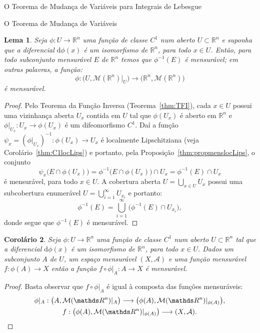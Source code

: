 \documentclass[oneside,final,11pt]{amsbook}
\newcommand{\R}{\mathds R}
\newcommand{\dd}{\mathrm d}
\newcommand{\Lebmens}{\mathcal M}
\theoremstyle{remark}\newtheorem{exercise}{Exercício}[chapter]
\theoremstyle{remark}\newtheorem{*exercise}[exercise]{\hbox to 0pt{\hskip 0pt minus 1fil*}Exercício}
\theoremstyle{definition}\newtheorem{exdefin}{Definição}[chapter]
\theoremstyle{plain}\newtheorem{teo}{Teorema}[section]
\theoremstyle{plain}\newtheorem{lem}[teo]{Lema}
\theoremstyle{plain}\newtheorem{prop}[teo]{Proposição}
\theoremstyle{plain}\newtheorem{cor}[teo]{Corolário}
\theoremstyle{definition}\newtheorem{defin}[teo]{Definição}
\theoremstyle{remark}\newtheorem{rem}[teo]{Observação}
\theoremstyle{definition}\newtheorem{notation}[teo]{Notação}
\theoremstyle{definition}\newtheorem{convention}[teo]{Convenção}
\theoremstyle{definition}\newtheorem{example}[teo]{Exemplo}
\numberwithin{section}{chapter}
\numberwithin{equation}{section}
\begin{document}
\begin{chapter}{O Teorema de Mudança de Variáveis para Integrais de Lebesgue}
\begin{section}{O Teorema de Mudança de Variáveis}
\begin{lem}\label{thm:difeoC1mensmens}
Seja $\phi:U\to\R^n$ uma função de classe $C^1$ num aberto $U\subset\R^n$ e suponha que a diferencial
$\dd\phi(x)$ é um isomorfismo de $\R^n$, para todo $x\in U$. Então, para todo subconjunto mensurável $E$
de $\R^n$ temos que $\phi^{-1}(E)$ é mensurável; em outras palavras, a função:
\[\phi:\big(U,\Lebmens(\R^n)\vert_U\big)\longrightarrow\big(\R^n,\Lebmens(\R^n)\big)\]
é mensurável.
\end{lem}
\begin{proof}
Pelo Teorema da Função Inversa (Teorema~\ref{thm:TFI}), cada $x\in U$ possui uma vizinhança aberta
$U_x$ contida em $U$ tal que $\phi(U_x)$ é aberto em $\R^n$ e $\phi\vert_{U_x}:U_x\to\phi(U_x)$ é um difeomorfismo
$C^1$. Daí a função $\psi_x=(\phi\vert_{U_x})^{-1}:\phi(U_x)\to U_x$ é localmente Lipschitziana
(veja Corolário~\ref{thm:C1locLips}) e portanto, pela Proposição~\ref{thm:propmenslocLips}, o conjunto
\[\psi_x\big(E\cap\phi(U_x)\big)=\phi^{-1}\big(E\cap\phi(U_x)\big)\cap U_x=\phi^{-1}(E)\cap U_x\]
é mensurável, para todo $x\in U$. A cobertura aberta $U=\bigcup_{x\in U}U_x$ possui uma subcobertura enumerável
$U=\bigcup_{i=1}^\infty U_{x_i}$ e portanto:
\[\phi^{-1}(E)=\bigcup_{i=1}^\infty\big(\phi^{-1}(E)\cap U_{x_i}\big),\]
donde segue que $\phi^{-1}(E)$ é mensurável.
\end{proof}

\begin{cor}\label{thm:fphimens}
Seja $\phi:U\to\R^n$ uma função de classe $C^1$ num aberto $U\subset\R^n$ tal que a diferencial
$\dd\phi(x)$ é um isomorfismo de $\R^n$, para todo $x\in U$. Dados um subconjunto $A$ de $U$, um espaço mensurável
$(X,\mathcal A)$ e uma função mensurável $f:\phi(A)\to X$ então a função $f\circ\phi\vert_A:A\to X$ é mensurável.
\end{cor}
\begin{proof}
Basta observar que $f\circ\phi\vert_A$ é igual à composta das funções mensuráveis:
\begin{gather*}
\phi\vert_A:\big(A,\Lebmens(\R^n)\vert_A\big)\longrightarrow\big(\phi(A),\Lebmens(\R^n)\vert_{\phi(A)}\big),\\
f:\big(\phi(A),\Lebmens(\R^n)\vert_{\phi(A)}\big)\longrightarrow(X,\mathcal A).\qedhere
\end{gather*}
\end{proof}


\end{section}
\end{chapter}
\end{document}
